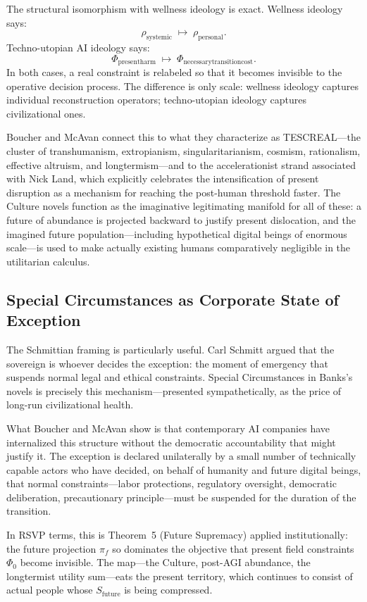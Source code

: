 \documentclass[12pt, a4paper]{article}
\theoremstyle{plain}
\theoremstyle{definition}
\theoremstyle{remark}
\begin{document}
The structural isomorphism with wellness ideology is exact.
Wellness ideology says:
\[
\rho_{\mathrm{systemic}} \;\mapsto\; \rho_{\mathrm{personal}}.
\]
Techno-utopian AI ideology says:
\[
\Phi_{\mathrm{present harm}} \;\mapsto\; \Phi_{\mathrm{necessary transition cost}}.
\]
In both cases, a real constraint is relabeled so that it becomes invisible to
the operative decision process.
The difference is only scale: wellness ideology captures individual reconstruction
operators; techno-utopian ideology captures civilizational ones.

Boucher and McAvan connect this to what they characterize as TESCREAL---the
cluster of transhumanism, extropianism, singularitarianism, cosmism, rationalism,
effective altruism, and longtermism---and to the accelerationist strand associated
with Nick Land, which explicitly celebrates the intensification of present disruption
as a mechanism for reaching the post-human threshold faster.
The Culture novels function as the imaginative legitimating manifold for all of these:
a future of abundance is projected backward to justify present dislocation,
and the imagined future population---including hypothetical digital beings of
enormous scale---is used to make actually existing humans comparatively negligible
in the utilitarian calculus.

\subsection{Special Circumstances as Corporate State of Exception}

The Schmittian framing is particularly useful.
Carl Schmitt argued that the sovereign is whoever decides the exception: the moment
of emergency that suspends normal legal and ethical constraints.
Special Circumstances in Banks's novels is precisely this mechanism---presented
sympathetically, as the price of long-run civilizational health.

What Boucher and McAvan show is that contemporary AI companies have internalized
this structure without the democratic accountability that might justify it.
The exception is declared unilaterally by a small number of technically capable
actors who have decided, on behalf of humanity and future digital beings, that
normal constraints---labor protections, regulatory oversight, democratic deliberation,
precautionary principle---must be suspended for the duration of the transition.

In RSVP terms, this is Theorem~5 (Future Supremacy) applied institutionally:
the future projection $\pi_f$ so dominates the objective that present field
constraints $\Phi_0$ become invisible.
The map---the Culture, post-AGI abundance, the longtermist utility sum---eats
the present territory, which continues to consist of actual people whose
$S_{\mathrm{future}}$ is being compressed.
\end{document}
